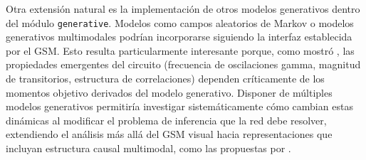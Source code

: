 
Otra extensión natural es la implementación de otros modelos generativos dentro del módulo \texttt{generative}. Modelos como campos aleatorios de Markov o modelos generativos multimodales podrían incorporarse siguiendo la interfaz establecida por el \acrshort{GSM}. Esto resulta particularmente interesante porque, como mostró \citet{echeveste2020cortical}, las propiedades emergentes del circuito (frecuencia de oscilaciones gamma, magnitud de transitorios, estructura de correlaciones) dependen críticamente de los momentos objetivo derivados del modelo generativo. Disponer de múltiples modelos generativos permitiría investigar sistemáticamente cómo cambian estas dinámicas al modificar el problema de inferencia que la red debe resolver, extendiendo el análisis más allá del \acrshort{GSM} visual hacia representaciones que incluyan estructura causal multimodal, como las propuestas por \citet{kording2007causal}.





